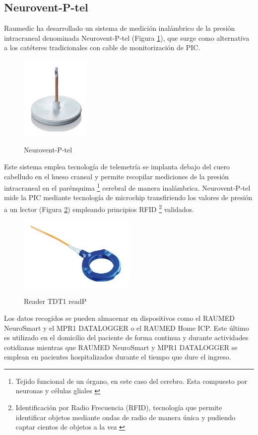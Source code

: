 \subsection{Neurovent-P-tel \cite{raumedic}}
Raumedic ha desarrollado un sistema de medición inalámbrico de la presión intracraneal denominada Neurovent-P-tel (Figura \ref{fig:neurovent}), que surge como alternativa a los catéteres tradicionales con cable de monitorización de PIC. 
\begin{figure}[h]
    \centering
    \includegraphics[width=0.3\textwidth]{img/neurovent.PNG}
    \caption{Neurovent-P-tel}
    \cite{raumedic}
    \label{fig:neurovent}
\end{figure}
Este sistema emplea tecnología de telemetría se implanta debajo del cuero cabelludo en el hueso craneal y permite recopilar mediciones de la presión intracraneal en el parénquima \footnote{Tejido funcional de un órgano, en este caso del cerebro. Esta compuesto por neuronas y células gliales \cite{parenquima}} cerebral de manera inalámbrica. Neurovent-P-tel mide la PIC mediante tecnología de microchip transfiriendo los valores de presión a un lector (Figura \ref{fig:readertdt1}) empleando principios RFID \footnote{Identificación por Radio Frecuencia (RFID), tecnología que permite identificar objetos mediante ondas de radio de manera única y pudiendo captar cientos de objetos a la vez \cite{rfid}} validados. 
\begin{figure}[h]
    \centering
    \includegraphics[width=0.5\textwidth]{img/readertdt1.PNG}
    \caption{Reader TDT1 readP}
    \cite{raumedic}
    \label{fig:readertdt1}
\end{figure}
Los datos recogidos se pueden almacenar en dispositivos como el RAUMED NeuroSmart y el MPR1 DATALOGGER o el RAUMED Home ICP. Este último es utilizado en el domicilio del paciente de forma continua y durante actividades cotidianas mientras que RAUMED NeuroSmart y MPR1 DATALOGGER se emplean en pacientes hospitalizados durante el tiempo que dure el ingreso.

